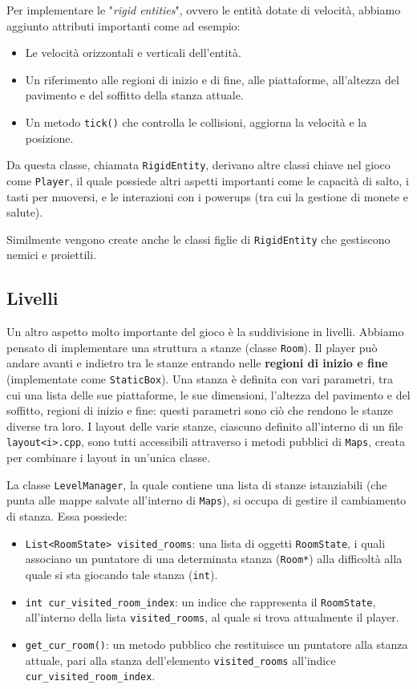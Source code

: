 \documentclass[a4paper,12pt]{article}
\begin{document}
Per implementare le "\textit{rigid entities}", ovvero le entità dotate di velocità, abbiamo aggiunto attributi importanti come ad esempio:
\begin{itemize}
\item Le velocità orizzontali e verticali dell’entità.
\item Un riferimento alle regioni di inizio e di fine, alle piattaforme, all’altezza del pavimento e del soffitto della stanza attuale.
\item Un metodo \texttt{tick()} che controlla le collisioni, aggiorna la velocità e la posizione.
\end{itemize}

Da questa classe, chiamata \texttt{RigidEntity}, derivano altre classi chiave nel gioco come \texttt{Player}, il quale possiede altri aspetti importanti come le capacità di salto, i tasti per muoversi, e le interazioni con i powerups (tra cui la gestione di monete e salute).

Similmente vengono create anche le classi figlie di \texttt{RigidEntity} che gestiscono nemici e proiettili.

\subsection{Livelli}
Un altro aspetto molto importante del gioco è la suddivisione in livelli. Abbiamo pensato di implementare una struttura a stanze (classe \texttt{Room}). Il player può andare avanti e indietro tra le stanze entrando nelle \textbf{regioni di inizio e fine} (implementate come \texttt{StaticBox}). Una stanza è definita con vari parametri, tra cui una lista delle sue piattaforme, le sue dimensioni, l’altezza del pavimento e del soffitto, regioni di inizio e fine: questi parametri sono ciò che rendono le stanze diverse tra loro.
I layout delle varie stanze, ciascuno definito all'interno di un file \texttt{layout<i>.cpp}, sono tutti accessibili attraverso i metodi pubblici di \texttt{Maps}, creata per combinare i layout in un'unica classe.

La classe \texttt{LevelManager}, la quale contiene una lista di stanze istanziabili (che punta alle mappe salvate all'interno di \texttt{Maps}), si occupa di gestire il cambiamento di stanza. Essa possiede: 
\begin{itemize}
\item \texttt{List<RoomState> visited\_rooms}: una lista di oggetti \texttt{RoomState}, i quali associano un puntatore di una determinata stanza (\texttt{Room*}) alla difficoltà alla quale si sta giocando tale stanza (\texttt{int}).
\item \texttt{int cur\_visited\_room\_index}: un indice che rappresenta il \texttt{RoomState}, all'interno della lista \texttt{visited\_rooms}, al quale si trova attualmente il player.
\item \texttt{get\_cur\_room()}: un metodo pubblico che restituisce un puntatore alla stanza attuale, pari alla stanza dell'elemento \texttt{visited\_rooms} all'indice \texttt{cur\_visited\_room\_index}.
\end{itemize} 
\end{document}
